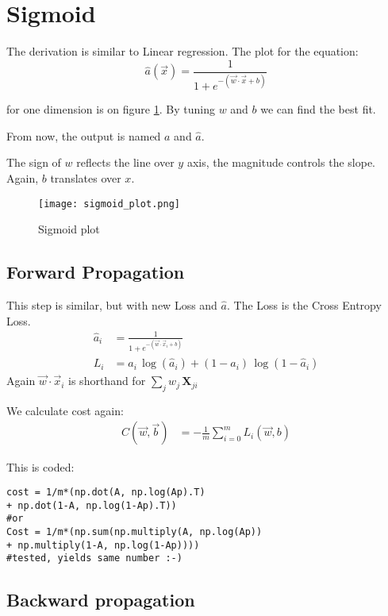 \section{Sigmoid}
The derivation is similar to Linear regression. The plot for the equation:
\[
  \hat{a}(\vec{x})= \frac{1}{1+e^{-(\vec{w}\cdot{}\vec{x}+b)}}
\]

for one dimension is on figure \ref{fig:sigmoid}. By tuning $w$ and $b$  we can find the best fit. 

From now, the output is named $a$ and $\hat{a}$.

The sign of $w$ reflects the line over $y$ axis, the magnitude controls the slope. Again, $b$ translates over $x$.

\begin{figure}[h]
 \centering
 \texttt{[image: sigmoid\_plot.png]}
  \caption{Sigmoid plot} \label{fig:sigmoid}
\end{figure}

\subsection{Forward Propagation}
This step is similar, but with new Loss and $\hat{a}$. 
The Loss is the Cross Entropy Loss.
\begin{align}
  \hat{a}_i &= \frac{1}{1+e^{-(\vec{w}\cdot \vec{x}_i + b)}}\\
  L_i &= a_i\,\log(\hat{a}_i) + (1-a_i)\,\log(1-\hat{a}_i)
\end{align}
Again $\vec{w}\cdot{}\vec{x}_i$ is shorthand for $\sum_{j} w_j\,\mathbf{X}_{ji}$

We calculate cost again:
\begin{align*}
  C(\vec{w}, \vec{b}) &= -\frac{1}{m}\sum_{i=0}^m L_i(\vec{w}, b)
\end{align*}

This is coded:
\begin{verbatim}
cost = 1/m*(np.dot(A, np.log(Ap).T) 
+ np.dot(1-A, np.log(1-Ap).T))
#or
Cost = 1/m*(np.sum(np.multiply(A, np.log(Ap)) 
+ np.multiply(1-A, np.log(1-Ap))))
#tested, yields same number :-)
\end{verbatim}

\subsection{Backward propagation}

